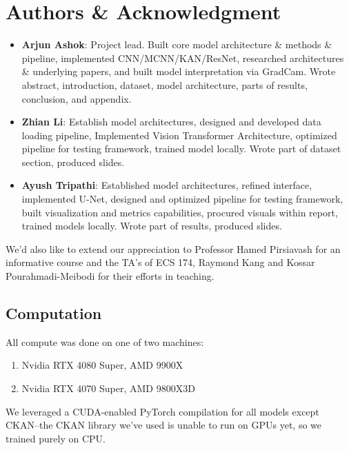 \documentclass[conference]{IEEEtran}
\begin{document}
\section{Authors \& Acknowledgment}
\begin{itemize}
    \item \textbf{Arjun Ashok}: Project lead. Built core model architecture \& methods \& pipeline, implemented CNN/MCNN/KAN/ResNet, researched architectures \& underlying papers, and built model interpretation via GradCam. Wrote abstract, introduction, dataset, model architecture, parts of results, conclusion, and appendix.
    \item \textbf{Zhian Li}: Establish model architectures, designed and developed data loading pipeline, Implemented Vision Transformer Architecture, optimized pipeline for testing framework, trained model locally. Wrote part of dataset section, produced slides.
    \item \textbf{Ayush Tripathi}: Established model architectures, refined interface, implemented U-Net, designed and optimized pipeline for testing framework, built visualization and metrics capabilities, procured visuals within report, trained models locally. Wrote part of results, produced slides. 
\end{itemize}

We'd also like to extend our appreciation to Professor Hamed Pirsiavash for an informative course and the TA's of ECS 174, Raymond Kang and Kossar Pourahmadi-Meibodi for their efforts in teaching.






\appendix
\subsection{Computation}
All compute was done on one of two machines:
\begin{enumerate}
    \item \label{app:machine_1} Nvidia RTX 4080 Super, AMD 9900X
    \item \label{app:machine_2} Nvidia RTX 4070 Super, AMD 9800X3D
\end{enumerate}

We leveraged a CUDA-enabled PyTorch compilation for all models except CKAN--the CKAN library we've used is unable to run on GPUs yet, so we trained purely on CPU.
\end{document}
